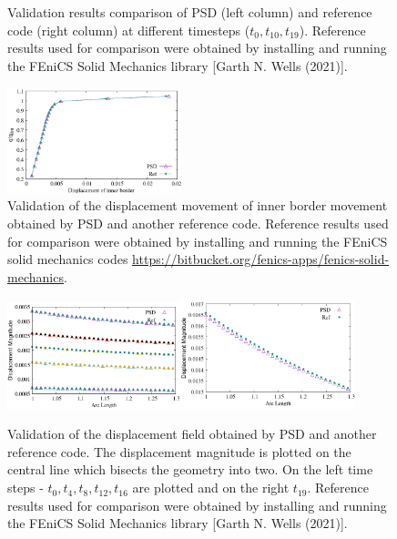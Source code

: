 \begin{figure}[h!]
	\caption{Validation results comparison of PSD (left column) and reference code (right column) at different timesteps ($t_0, t_{10}, t_{19}$). Reference results used for comparison  were obtained by installing and running the FEniCS Solid Mechanics library [Garth N. Wells (2021)]. \label{comp2-ep}}
\end{figure}

\begin{figure}[h!] 
	\centering
	\includegraphics[width=0.45\textwidth]{./Images/final.png}
	\caption{Validation of the displacement  movement of inner border movement obtained by PSD and another reference code.  Reference results used for comparison  were obtained by installing and running the FEniCS solid mechanics codes \url{https://bitbucket.org/fenics-apps/fenics-solid-mechanics}. \label{comp3-ep}}
\end{figure}

\begin{figure}[h!]
	\centering
	\includegraphics[width=0.45\textwidth]{./Images/t5.png}\includegraphics[width=0.45\textwidth]{./Images/t19.png}
	\caption{Validation of the displacement field obtained by PSD and another reference code. The displacement magnitude is plotted on the central line which bisects the geometry into two. On the left time steps - $t_0,t_4,t_8,t_{12},t_{16}$ are plotted and on the right $t_{19}$. Reference results used for comparison  were obtained by installing and running the FEniCS Solid Mechanics library [Garth N. Wells (2021)]. \label{comp1-ep}}
\end{figure}

